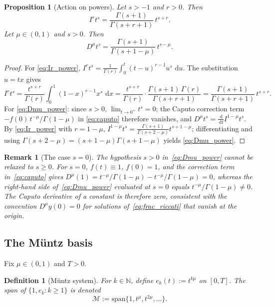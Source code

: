 \documentclass[11pt,a4paper]{article}
\newtheorem{proposition}[theorem]{Proposition}
\newtheorem{definition}[theorem]{Definition}
\newtheorem{remark}[theorem]{Remark}
\newcommand{\N}{\mathbb{N}}
\newcommand{\dd}{\,\mathrm{d}}
\begin{document}
\begin{proposition}[Action on powers]\label{prop:powers}
Let \(s>-1\) and \(r>0\). Then
\begin{equation}\label{eq:Ir_power}
I^r t^s = \frac{\Gamma(s+1)}{\Gamma(s+r+1)}\,t^{s+r}.
\end{equation}
Let \(\mu\in(0,1)\) and \(s>0\). Then
\begin{equation}\label{eq:Dmu_power}
D^\mu t^s = \frac{\Gamma(s+1)}{\Gamma(s+1-\mu)}\,t^{s-\mu}.
\end{equation}
\end{proposition}

\begin{proof}
For \eqref{eq:Ir_power}, \(I^r t^s=\frac{1}{\Gamma(r)}\int_0^t(t-u)^{r-1}u^s\,\dd u\). The substitution \(u=tx\) gives
\[
I^r t^s
= \frac{t^{s+r}}{\Gamma(r)}\int_0^1(1-x)^{r-1}x^s\,\dd x
= \frac{t^{s+r}}{\Gamma(r)}\cdot\frac{\Gamma(s+1)\,\Gamma(r)}{\Gamma(s+r+1)}
= \frac{\Gamma(s+1)}{\Gamma(s+r+1)}\,t^{s+r}.
\]
For \eqref{eq:Dmu_power}: since \(s>0\), \(\lim_{t\to0^+}t^s=0\); the Caputo correction term \(-f(0)\,t^{-\mu}/\Gamma(1-\mu)\) in \eqref{eq:caputo} therefore vanishes, and \(D^\mu t^s=\frac{\dd}{\dd t}I^{1-\mu}t^s\).
By \eqref{eq:Ir_power} with \(r=1-\mu\), \(I^{1-\mu}t^s=\frac{\Gamma(s+1)}{\Gamma(s+2-\mu)}t^{s+1-\mu}\); differentiating and using \(\Gamma(s+2-\mu)=(s+1-\mu)\Gamma(s+1-\mu)\) yields \eqref{eq:Dmu_power}.
\end{proof}

\begin{remark}[The case \(s=0\)]\label{rem:Dmu_const}
The hypothesis \(s>0\) in~\eqref{eq:Dmu_power} cannot be relaxed to \(s\ge0\). For \(s=0\), \(f(t)\equiv1\), \(f(0)=1\), and the correction term in~\eqref{eq:caputo} gives \(D^\mu(1)=t^{-\mu}/\Gamma(1-\mu)-t^{-\mu}/\Gamma(1-\mu)=0\), whereas the right-hand side of~\eqref{eq:Dmu_power} evaluated at \(s=0\) equals \(t^{-\mu}/\Gamma(1-\mu)\ne0\). The Caputo derivative of a constant is therefore zero, consistent with the convention \(D^\mu y(0)=0\) for solutions of~\eqref{eq:frac_riccati} that vanish at the origin.
\end{remark}

\subsection{The M\"untz basis}

Fix \(\mu\in(0,1)\) and \(T>0\).

\begin{definition}[M\"untz system]\label{def:muntz}
For \(k\in\N\), define \(e_k(t):=t^{k\mu}\) on \([0,T]\).
The span of \(\{1,e_k:k\ge1\}\) is denoted
\[
\mathcal{M} := \mathrm{span}\{1,t^{\mu},t^{2\mu},\ldots\}.
\]
\end{definition}
\end{document}

